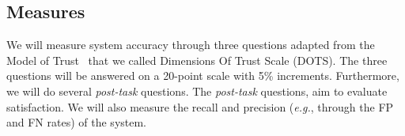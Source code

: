 \subsection{Measures}
\label{sec:sec00405}

We will measure system accuracy through three questions adapted from the Model of Trust~\cite{schoorman2016perspective} that we called Dimensions Of Trust Scale (DOTS).
The three questions will be answered on a 20-point scale with 5\% increments.
Furthermore, we will do several {\it post-task} questions.
The {\it post-task} questions, aim to evaluate satisfaction.
We will also measure the recall and precision ({\it e.g.}, through the FP and FN rates) of the system.

\clearpage